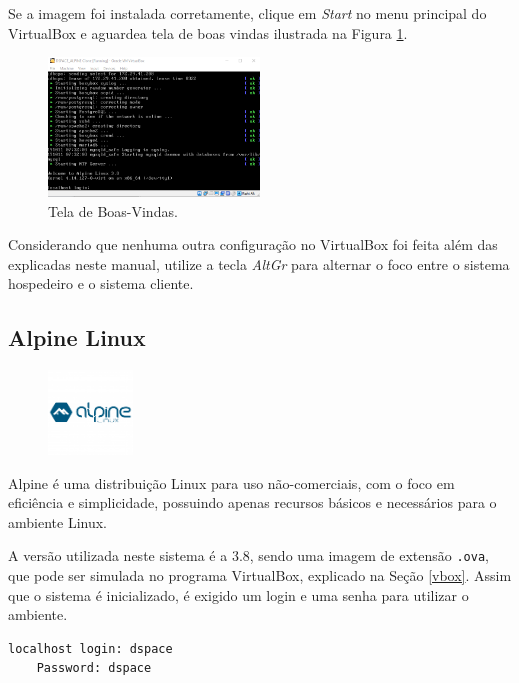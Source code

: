 Se a imagem foi instalada corretamente, clique em \textit{Start} no menu principal do VirtualBox e aguardea tela de boas vindas ilustrada na Figura \ref{fig1}.
\begin{figure}[h]
    \centering
    \includegraphics[width=0.5\textwidth]{images/vbox2.png}
    \caption{Tela de Boas-Vindas.}
    \label{fig1}
\end{figure}

Considerando que nenhuma outra configuração no VirtualBox foi feita além das explicadas neste manual, utilize a tecla \textit{AltGr} para alternar o foco entre o sistema hospedeiro e o sistema cliente. 

\subsection{Alpine Linux}\label{alpine}

 \begin{figure} %
     \centering
     \includegraphics[width=0.2\textwidth]{../images/alpine.png}
     \label{fig2}
 \end{figure}

Alpine é uma distribuição Linux para uso não-comerciais, com o foco em eficiência e simplicidade, possuindo apenas recursos básicos e necessários para o ambiente Linux.

A versão utilizada neste sistema é a 3.8, sendo uma imagem de extensão \lstinline{.ova}, que pode ser simulada no programa VirtualBox, explicado na Seção \ref{vbox}. Assim que o sistema é inicializado, é exigido um login e uma senha para utilizar o ambiente. 

\begin{lstlisting}[language=bash, label=lst1, caption=Login e senha de acesso]
    localhost login: dspace
    Password: dspace
\end{lstlisting}

